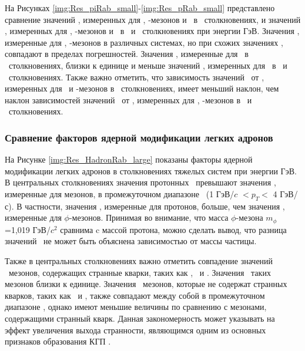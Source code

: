 \newpage
На Рисунках \ref{img:Res_piRab_small}-\ref{img:Res_pRab_small} представлено сравнение значений \rab, измеренных для  \pipm, \Kpm-мезонов и \aprot \ в \pal \ столкновениях, и значений \rab, измеренных для \pipm, \Kpm-мезонов и \prots \ в \dau \ и \heau \ столкновениях при энергии  ГэВ. Значения \rab, измеренные для \pipm, \Kpm-мезонов в различных системах, но при схожих значениях \Npart, совпадают в пределах погрешностей. Значения \rab, измеренные для \aprot \ в \pal \ столкновениях, близки к единице и меньше значений \rab, измеренных для \prots \ в \heau \ и \dau \ столкновениях. Также важно отметить, что зависимость значений \rab \ от \pt, измеренных для \pipm \ и \Kpm-мезонов в \pal \ столкновениях, имеет меньший наклон, чем наклон зависимостей значений \rab \ от \pt, измеренных для \pipm, \Kpm-мезонов в \dau \ и \heau \ столкновениях. 

\subsubsection{Сравнение факторов ядерной модификации легких адронов}
На Рисунке \ref{img:Res_HadronRab_large} показаны факторы ядерной модификации легких адронов в столкновениях тяжелых систем при энергии  ГэВ. В центральных столкновениях значения протонных \rab \ превышают значения \rab, измеренные для мезонов, в промежуточном диапазоне \pt \ (1 ГэВ/$c$ $< p_T <$ 4 ГэВ/с). В частности, значения \rab, измеренные для протонов, больше, чем значения \rab, измеренные для $\phi$-мезонов. Принимая во внимание, что масса $\phi$-мезона $m_{\phi}$=1,019 ГэВ/$c^{2}$ сравнима c массой протона, можно сделать вывод, что разница значений \rab \ не может быть объяснена зависимостью от массы частицы.  


Также в центральных столкновениях важно отметить совпадение значений \rab \ мезонов, содержащих странные кварки, таких как \Kstar, \phim \ и \Kpm. Значения \rab \ таких мезонов близки к единице. Значения \rab \ мезонов, которые не содержат странных кварков, таких как \pio \ и \pipm,  также совпадают между собой в промежуточном диапазоне \pt, однако имеют меньшие величины по сравнению с мезонами, содержащими странный кварк. Данная закономерность может указывать на эффект увеличения выхода странности, являющимся одним из основных признаков образования КГП \cite{Strangeness_QGP, StrangEnh, ThermalStrangeness}.

